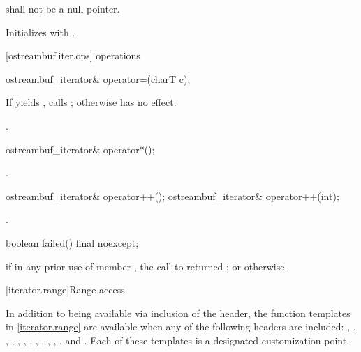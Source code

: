 \begin{itemdescr}
\pnum
\requires
{}
shall not be a null pointer.

\pnum
\effects
Initializes  with .
\end{itemdescr}

[ostreambuf.iter.ops]{ operations}

%
\begin{itemdecl}
ostreambuf_iterator& operator=(charT c);
\end{itemdecl}

\begin{itemdescr}
\pnum
\effects
If
yields
,
calls
;
otherwise has no effect.

\pnum
\returns
{}.
\end{itemdescr}

%
\begin{itemdecl}
ostreambuf_iterator& operator*();
\end{itemdecl}

\begin{itemdescr}
\pnum
\returns
{}.
\end{itemdescr}

%
\begin{itemdecl}
ostreambuf_iterator& operator++();
ostreambuf_iterator& operator++(int);
\end{itemdecl}

\begin{itemdescr}
\pnum
\returns
{}.
\end{itemdescr}

%
\begin{itemdecl}
boolean failed() final noexcept;
\end{itemdecl}

\begin{itemdescr}
\pnum
\returns
{}
if in any prior use of member
,
the call to
returned
;
or
otherwise.
\end{itemdescr}

[iterator.range]{Range access}

\pnum
In addition to being available via inclusion of the  header,
the function templates in \ref{iterator.range} are available when any of the following
headers are included: , , ,
, , , , , ,
, , , and .
Each of these templates
is a designated customization point.

